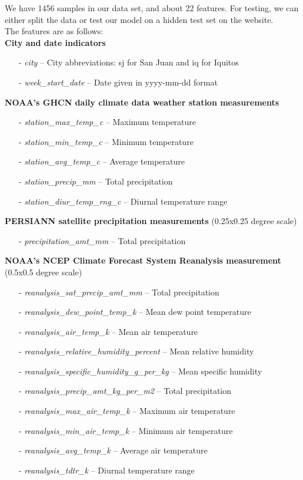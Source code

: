 \documentclass[english]{article}
\begin{document}
We have 1456 samples in our data set, and about 22 features. For testing, we can either split the data or test our model on a hidden test set on the website.\\

The features are as follows:\\

\textbf{City and date indicators}
\begin{itemize}
    \item[-] \textit{city} --  City abbreviations: sj for San Juan and iq for Iquitos
    \item[-] \textit{week\_start\_date} -- Date given in yyyy-mm-dd format
\end{itemize}
\textbf{NOAA's GHCN daily climate data weather station measurements}
\begin{itemize}
    \item[-] \textit{station\_max\_temp\_c} -- Maximum temperature
    \item[-] \textit{station\_min\_temp\_c} -- Minimum temperature
    \item[-] \textit{station\_avg\_temp\_c} -- Average temperature
    \item[-] \textit{station\_precip\_mm} -- Total precipitation
    \item[-] \textit{station\_diur\_temp\_rng\_c} -- Diurnal temperature range
\end{itemize}
\textbf{PERSIANN satellite precipitation measurements} (0.25x0.25 degree scale)
\begin{itemize}
    \item[-] \textit{precipitation\_amt\_mm} -- Total precipitation
\end{itemize}
\textbf{NOAA's NCEP Climate Forecast System Reanalysis measurement} (0.5x0.5 degree scale)
\begin{itemize}
    \item[-] \textit{reanalysis\_sat\_precip\_amt\_mm} -- Total precipitation
    \item[-] \textit{reanalysis\_dew\_point\_temp\_k} -- Mean dew point temperature
    \item[-] \textit{reanalysis\_air\_temp\_k} -- Mean air temperature
    \item[-] \textit{reanalysis\_relative\_humidity\_percent} -- Mean relative humidity
    \item[-] \textit{reanalysis\_specific\_humidity\_g\_per\_kg} -- Mean specific humidity
    \item[-] \textit{reanalysis\_precip\_amt\_kg\_per\_m2} -- Total precipitation
    \item[-] \textit{reanalysis\_max\_air\_temp\_k} -- Maximum air temperature
    \item[-] \textit{reanalysis\_min\_air\_temp\_k} -- Minimum air temperature
    \item[-] \textit{reanalysis\_avg\_temp\_k} -- Average air temperature
    \item[-] \textit{reanalysis\_tdtr\_k} -- Diurnal temperature range
\end{itemize}
\end{document}
